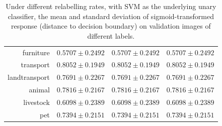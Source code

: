 \documentclass[11pt,a4paper]{book}
\begin{document}
\begin{table}[htbp]
\begin{tabular}{r|c|c|c}
furniture     & $0.5707\pm0.2492$ & $0.5707\pm0.2492$ & $0.5707\pm0.2492$\\
transport     & $0.8052\pm0.1949$ & $0.8052\pm0.1949$ & $0.8052\pm0.1949$\\
landtransport & $0.7691\pm0.2267$ & $0.7691\pm0.2267$ & $0.7691\pm0.2267$\\
animal        & $0.7816\pm0.2167$ & $0.7816\pm0.2167$ & $0.7816\pm0.2167$\\
livestock     & $0.6098\pm0.2389$ & $0.6098\pm0.2389$ & $0.6098\pm0.2389$\\
pet           & $0.7394\pm0.2151$ & $0.7394\pm0.2151$ & $0.7394\pm0.2151$
\end{tabular}
\caption{Under different relabelling rates, with SVM as the underlying unary classifier, the mean and standard deviation of sigmoid-transformed response (distance to decision boundary) on validation images of different labels.}
\label{tab:svmresp}
\end{table}
\end{document}
